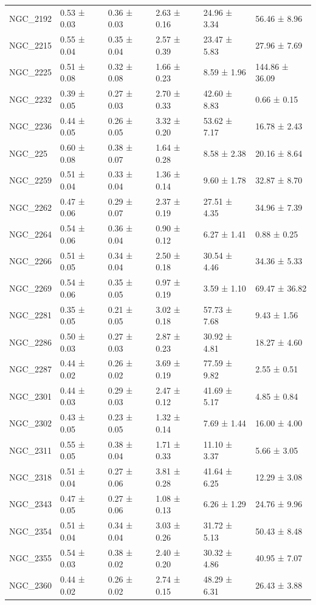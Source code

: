 \begin{tabular}{llllll}
NGC_2192 & 0.53 ± 0.03 & 0.36 ± 0.03 & 2.63 ± 0.16 & 24.96 ± 3.34 & 56.46 ± 8.96 \\
NGC_2215 & 0.55 ± 0.04 & 0.35 ± 0.04 & 2.57 ± 0.39 & 23.47 ± 5.83 & 27.96 ± 7.69 \\
NGC_2225 & 0.51 ± 0.08 & 0.32 ± 0.08 & 1.66 ± 0.23 & 8.59 ± 1.96 & 144.86 ± 36.09 \\
NGC_2232 & 0.39 ± 0.05 & 0.27 ± 0.03 & 2.70 ± 0.33 & 42.60 ± 8.83 & 0.66 ± 0.15 \\
NGC_2236 & 0.44 ± 0.05 & 0.26 ± 0.05 & 3.32 ± 0.20 & 53.62 ± 7.17 & 16.78 ± 2.43 \\
NGC_225 & 0.60 ± 0.08 & 0.38 ± 0.07 & 1.64 ± 0.28 & 8.58 ± 2.38 & 20.16 ± 8.64 \\
NGC_2259 & 0.51 ± 0.04 & 0.33 ± 0.04 & 1.36 ± 0.14 & 9.60 ± 1.78 & 32.87 ± 8.70 \\
NGC_2262 & 0.47 ± 0.06 & 0.29 ± 0.07 & 2.37 ± 0.19 & 27.51 ± 4.35 & 34.96 ± 7.39 \\
NGC_2264 & 0.54 ± 0.06 & 0.36 ± 0.04 & 0.90 ± 0.12 & 6.27 ± 1.41 & 0.88 ± 0.25 \\
NGC_2266 & 0.51 ± 0.05 & 0.34 ± 0.04 & 2.50 ± 0.18 & 30.54 ± 4.46 & 34.36 ± 5.33 \\
NGC_2269 & 0.54 ± 0.06 & 0.35 ± 0.05 & 0.97 ± 0.19 & 3.59 ± 1.10 & 69.47 ± 36.82 \\
NGC_2281 & 0.35 ± 0.05 & 0.21 ± 0.05 & 3.02 ± 0.18 & 57.73 ± 7.68 & 9.43 ± 1.56 \\
NGC_2286 & 0.50 ± 0.03 & 0.27 ± 0.03 & 2.87 ± 0.23 & 30.92 ± 4.81 & 18.27 ± 4.60 \\
NGC_2287 & 0.44 ± 0.02 & 0.26 ± 0.02 & 3.69 ± 0.19 & 77.59 ± 9.82 & 2.55 ± 0.51 \\
NGC_2301 & 0.44 ± 0.03 & 0.29 ± 0.03 & 2.47 ± 0.12 & 41.69 ± 5.17 & 4.85 ± 0.84 \\
NGC_2302 & 0.43 ± 0.05 & 0.23 ± 0.05 & 1.32 ± 0.14 & 7.69 ± 1.44 & 16.00 ± 4.00 \\
NGC_2311 & 0.55 ± 0.05 & 0.38 ± 0.04 & 1.71 ± 0.33 & 11.10 ± 3.37 & 5.66 ± 3.05 \\
NGC_2318 & 0.51 ± 0.04 & 0.27 ± 0.06 & 3.81 ± 0.28 & 41.64 ± 6.25 & 12.29 ± 3.08 \\
NGC_2343 & 0.47 ± 0.05 & 0.27 ± 0.06 & 1.08 ± 0.13 & 6.26 ± 1.29 & 24.76 ± 9.96 \\
NGC_2354 & 0.51 ± 0.04 & 0.34 ± 0.04 & 3.03 ± 0.26 & 31.72 ± 5.13 & 50.43 ± 8.48 \\
NGC_2355 & 0.54 ± 0.03 & 0.38 ± 0.02 & 2.40 ± 0.20 & 30.32 ± 4.86 & 40.95 ± 7.07 \\
NGC_2360 & 0.44 ± 0.02 & 0.26 ± 0.02 & 2.74 ± 0.15 & 48.29 ± 6.31 & 26.43 ± 3.88 \\

\end{tabular}

